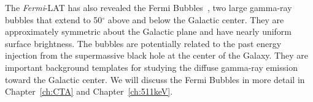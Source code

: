 \documentclass[doublespace,nopageskip]{VTthesis}
\begin{document}

{The \textit{Fermi}-LAT has also revealed the Fermi Bubbles~\cite{2010ApJ...724.1044S}, two large gamma-ray bubbles that extend to 50$^\circ$ above and below the Galactic center. They are approximately symmetric about the Galactic plane and have nearly uniform surface brightness. The bubbles are potentially related to the past energy injection from the supermassive black hole at the center of the Galaxy. They are important background templates for studying the diffuse gamma-ray emission toward the Galactic center. We will discuss the Fermi Bubbles in more detail in Chapter~\ref{ch:CTA} and Chapter~\ref{ch:511keV}.   }

\end{document}
